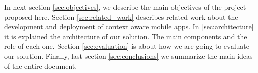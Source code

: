 In next section \ref{sec:objectives}, we describe the main
objectives of the project proposed here.
Section \ref{sec:related_work} describes related
work about the development and deployment of
context aware mobile apps.
In \ref{sec:architecture} it is explained the architecture of our solution. The main components and the role of
each one.
Section \ref{sec:evaluation} is about how we are going
to evaluate our solution.
Finally, last section \ref{sec:conclusions} we summarize
the main ideas of the entire document.

